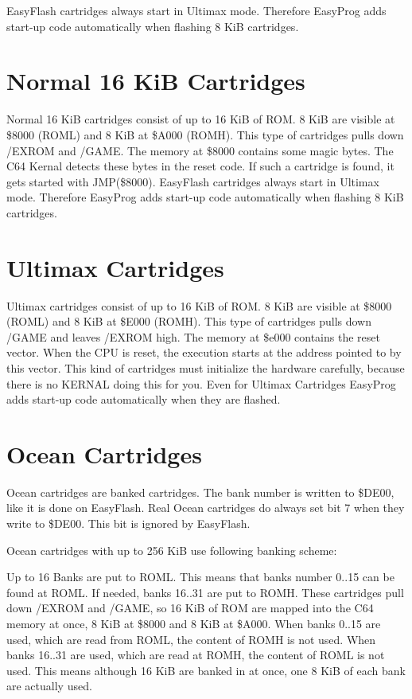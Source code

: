 \documentclass[a4paper,oneside]{memoir}
\begin{document}
EasyFlash cartridges always start in Ultimax mode. Therefore EasyProg adds
start-up code automatically when flashing 8 KiB cartridges.

\section{Normal 16 KiB Cartridges}

Normal 16 KiB cartridges consist of up to 16 KiB of ROM. 8 KiB are visible at
\$8000 (ROML) and 8 KiB at \$A000 (ROMH). This type of cartridges pulls down
/EXROM and /GAME.
The memory at \$8000 contains some magic bytes. The C64 Kernal detects these
bytes in the reset code. If such a cartridge is found, it gets started with
JMP(\$8000).
EasyFlash cartridges always start in Ultimax mode. Therefore EasyProg adds
start-up code automatically when flashing 8 KiB cartridges.

\section{Ultimax Cartridges}

Ultimax cartridges consist of up to 16 KiB of ROM. 8 KiB are visible at \$8000
(ROML) and 8 KiB at \$E000 (ROMH). This type of cartridges pulls down /GAME and
leaves /EXROM high.
The memory at \$e000 contains the reset vector. When the CPU is reset, the
execution starts at the address pointed to by this vector. This kind of
cartridges must initialize the hardware carefully, because there is no KERNAL
doing this for you.
Even for Ultimax Cartridges EasyProg adds start-up code automatically when they
are flashed.

\section{Ocean Cartridges}

Ocean cartridges are banked cartridges. The bank number is written to \$DE00,
like it is done on EasyFlash.
Real Ocean cartridges do always set bit 7 when they write to \$DE00. This bit
is ignored by EasyFlash.

Ocean cartridges with up to 256 KiB use following banking scheme:

Up to 16 Banks are put to ROML. This means that banks number 0..15 can be found
at ROML. If needed, banks 16..31 are put to ROMH. These cartridges pull down
/EXROM and /GAME, so 16 KiB of ROM are mapped into the C64 memory at once, 8
KiB at \$8000 and 8 KiB at \$A000.
When banks 0..15 are used, which are read from ROML, the content of ROMH is not
used. When banks 16..31 are used, which are read at ROMH, the content of ROML
is not used. This means although 16 KiB are banked in at once, one 8 KiB of
each bank are actually used.
\end{document}

